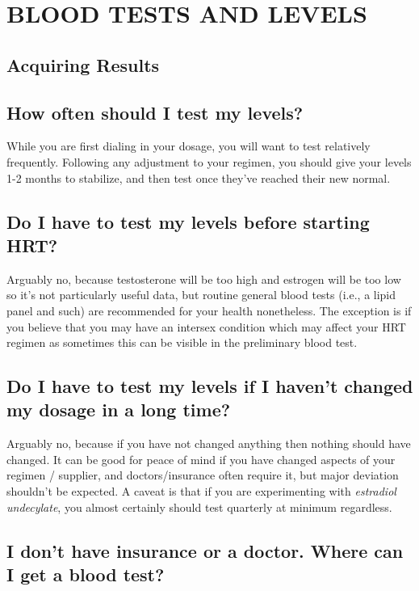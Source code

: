 \documentclass{article}
\begin{document}
\section{BLOOD TESTS AND LEVELS}

\subsection*{Acquiring Results}

\subsection{How often should I test my levels?}

While you are first dialing in your dosage, you will want to test relatively frequently. Following any adjustment to your regimen, you should give your levels 1-2 months to stabilize, and then test once they've reached their new normal.

\subsection{Do I have to test my levels before starting HRT?}

Arguably no, because testosterone will be too high and estrogen will be too low so it’s not particularly useful data, but routine general blood tests (i.e., a lipid panel and such) are recommended for your health nonetheless. The exception is if you believe that you may have an intersex condition which may affect your HRT regimen as sometimes this can be visible in the preliminary blood test.

\subsection{Do I have to test my levels if I haven’t changed my dosage in a long time?}

Arguably no, because if you have not changed anything then nothing should have changed. It can be good for peace of mind if you have changed aspects of your regimen / supplier, and doctors/insurance often require it, but major deviation shouldn’t be expected. A caveat is that if you are experimenting with \textit{estradiol undecylate}, you almost certainly should test quarterly at minimum regardless.

\subsection{I don’t have insurance or a doctor. Where can I get a blood test?}
\end{document}
